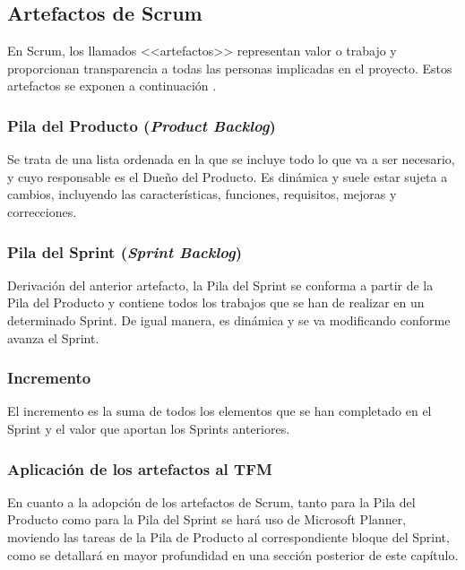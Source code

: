 \subsection{Artefactos de Scrum}
En Scrum, los llamados <<artefactos>> representan valor o trabajo y proporcionan transparencia a todas las personas implicadas en el proyecto. Estos artefactos se exponen a continuación \cite{scrumguide}.

\subsubsection{Pila del Producto (\textit{Product Backlog})}
Se trata de una lista ordenada en la que se incluye todo lo que va a ser necesario, y cuyo responsable es el Dueño del Producto. Es dinámica y suele estar sujeta a cambios, incluyendo las características, funciones, requisitos, mejoras y correcciones.

\subsubsection{Pila del Sprint (\textit{Sprint Backlog})}
Derivación del anterior artefacto, la Pila del Sprint se conforma a partir de la Pila del Producto y contiene todos los trabajos que se han de realizar en un determinado Sprint. De igual manera, es dinámica y se va modificando conforme avanza el Sprint.

\subsubsection{Incremento}
El incremento es la suma de todos los elementos que se han completado en el Sprint y el valor que aportan los Sprints anteriores.

\subsubsection{Aplicación de los artefactos al \acs{TFM}}
En cuanto a la adopción de los artefactos de Scrum, tanto para la Pila del Producto como para la Pila del Sprint se hará uso de Microsoft Planner, moviendo las tareas de la Pila de Producto al correspondiente bloque del Sprint, como se detallará en mayor profundidad en una sección posterior de este capítulo.



\clearpage

